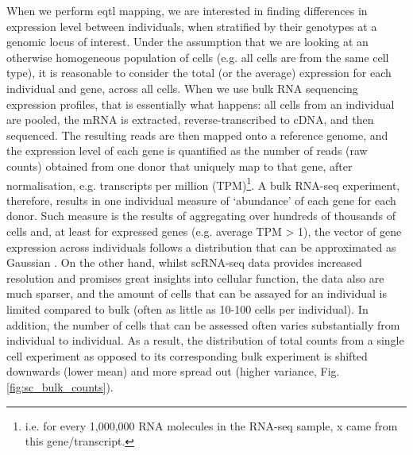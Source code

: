 When we perform \gls{eqtl} mapping, we are interested in finding differences in expression level between individuals, when stratified by their genotypes at a genomic locus of interest. 
Under the assumption that we are looking at an otherwise homogeneous population of cells (e.g. all cells are from the same cell type), it is reasonable to consider the total (or the average) expression for each individual and gene, across all cells.
When we use bulk RNA sequencing expression profiles, that is essentially what happens: all cells from an individual are pooled, the mRNA is extracted, reverse-transcribed to cDNA, and then sequenced. 
The resulting reads are then mapped onto a reference genome, and the expression level of each gene is quantified as the number of reads (raw counts) obtained from one donor that uniquely map to that gene, after normalisation, e.g. transcripts per million (TPM)\footnote{i.e. for every 1,000,000 RNA molecules in the RNA-seq sample, x came from this gene/transcript.}. 
A bulk RNA-seq experiment, therefore, results in one individual measure of `abundance' of each gene for each donor. 
Such measure is the results of aggregating over 
hundreds of thousands of cells
and, at least for expressed genes (e.g. average TPM > 1), the vector of gene expression across individuals follows a distribution that can be approximated as Gaussian \cite{piras2015reduction}.
On the other hand,
whilst scRNA-seq data provides increased resolution and promises great insights into cellular function, the data also are much sparser, and the amount of cells that can be assayed for an individual is limited compared to bulk (often as little as 10-100 cells per individual). 
In addition, the number of cells that can be assessed often varies substantially from individual to individual.
As a result, the distribution of total counts from a single cell experiment as opposed to its corresponding bulk experiment is shifted downwards (lower mean) and more spread out (higher variance, Fig. \ref{fig:sc_bulk_counts}).

